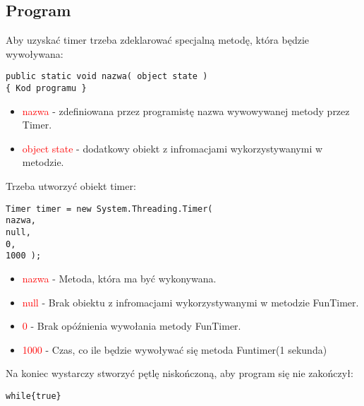 \documentclass{article}
\begin{document}
\subsection{Program}
Aby uzyskać timer trzeba zdeklarować specjalną metodę, która będzie wywoływana:
\begin{lstlisting}[frame=single]
public static void nazwa( object state )
{ Kod programu }
\end{lstlisting}
\begin{itemize}
\item \textcolor{red}{nazwa} - zdefiniowana przez programistę nazwa wywowywanej metody przez Timer.
\item \textcolor{red}{object state} - dodatkowy obiekt z infromacjami wykorzystywanymi w metodzie.
\end{itemize}
Trzeba utworzyć obiekt timer:
\begin{lstlisting}[frame=single]
Timer timer = new System.Threading.Timer(
nazwa,
null,
0,
1000 );
 \end{lstlisting}
\begin{itemize}
\item \textcolor{red}{nazwa} - Metoda, która ma być wykonywana.
\item \textcolor{red}{null} - Brak obiektu z infromacjami wykorzystywanymi w metodzie FunTimer.
\item \textcolor{red}{0} - Brak opóźnienia wywołania metody FunTimer.
\item \textcolor{red}{1000} - Czas, co ile będzie wywoływać się metoda Funtimer(1 sekunda)
\end{itemize}
Na koniec wystarczy stworzyć pętlę niskończoną, aby program się nie zakończył:
\begin{lstlisting}[frame=single]
while{true}
\end{lstlisting}
\end{document}
